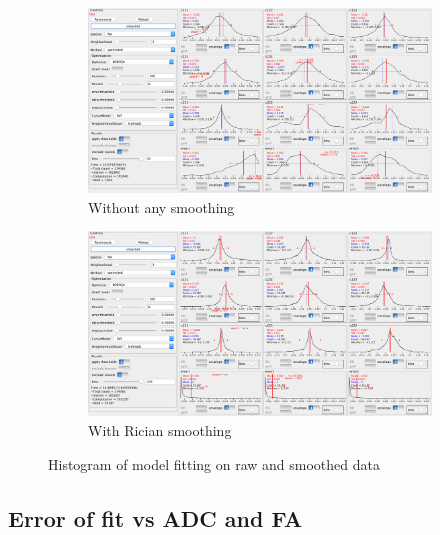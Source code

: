 \begin{figure}
    \centering
    \begin{subfigure}{.48\textwidth}
        \includegraphics[width=\textwidth]{figures/histogram_pig6_no_smooth}
        \caption{Without any smoothing}
        \label{fig:histogram_pig6_no_smooth}
    \end{subfigure}
    \begin{subfigure}{.48\textwidth}
        \includegraphics[width=\textwidth]{figures/histogram_pig6_smooth}
        \caption{With Rician smoothing}
        \label{fig:histogram_pig6_smooth}
    \end{subfigure}
    \caption{Histogram of model fitting on raw and smoothed data}
    \label{fig:pig6_histograms}
\end{figure}

\subsection{Error of fit vs ADC and FA}

